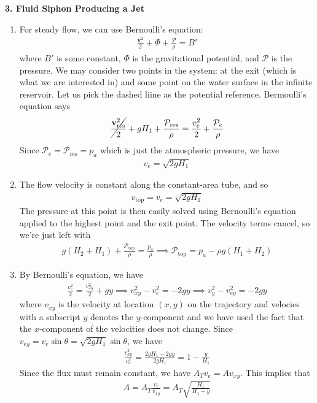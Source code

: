 \documentclass{article}
\theoremstyle{definition}
\newcommand{\f}[2]{\frac{#1}{#2}}
\begin{document}
\noindent \textbf{3. Fluid Siphon Producing a Jet} 

\begin{enumerate}[label=(\alph*)]
	\item For steady flow, we can use Bernoulli's equation:
	\begin{align*}
	\f{\mathbf{v}^2}{2} + \Phi + \f{\mathcal{P}}{\rho} = B' 
	\end{align*}
	where $B'$ is some constant, $\Phi$ is the gravitational potential, and $\mathcal{P}$ is the pressure. We may consider two points in the system: at the exit (which is what we are interested in) and some point on the water surface in the infinite reservoir. Let us pick the dashed liine as the potential reference. Bermoulli's equation says
	\begin{align*}
	\cancel{\f{\mathbf{v}_\text{res}^2}{2}} + gH_1 + \f{\mathcal{P}_\text{res}}{\rho}  = \f{v_e^2}{2} + \f{\mathcal{P}_e}{\rho}
	\end{align*}
	Since $\mathcal{P}_e = \mathcal{P}_\text{res} = p_a$ which is just the atmospheric pressure, we have
	\begin{align*}
	\boxed{v_e = \sqrt{2g H_1}}
	\end{align*}
	
	\item The flow velocity is constant along the constant-area tube, and so 
	\begin{align*}
	\boxed{v_\text{top} = v_e = \sqrt{2 g H_1}}
	\end{align*}
	The pressure at this point is then easily solved using Bernoulli's equation applied to the highest point and the exit point. The velocity terms cancel, so we're just left with
	\begin{align*}
	g(H_2+H_1) + \f{\mathcal{P}_\text{top}}{\rho} =  \f{p_a}{\rho} \implies \boxed{\mathcal{P}_\text{top} = p_a - \rho g (H_1 +  H_2) }
	\end{align*}
	
	
	
	
	\item By Bernoulli's equation, we have
	\begin{align*}
	\f{v_e^2}{2} = \f{v_{xy}^2}{2} + gy \implies v_{xy}^2 - v_e^2 = -2gy \implies v_y^2 - v_{ey}^2 = -2gy
	\end{align*}
	where $v_{xy}$ is the velocity at location $(x,y)$ on the trajectory and velocies with a subscript $y$ denotes the $y$-component and we have used the fact that the $x$-component of the velocities does not change. Since $v_{ey} =  v_e\sin\theta = \sqrt{2g H_1}\sin\theta$, we have
	\begin{align*}
	\f{v_{xy}^2}{v_e^2} = \f{2g H_1  -2gy}{2g H_1} = 1-\f{y}{H_1}
	\end{align*}
	Since the flux must remain constant, we have $A_T v_e = A v_{xy}$. This implies that
	\begin{align*}
	\boxed{A = A_T \f{v_e}{v_{xy}} = A_T \sqrt{\f{H_1}{H_1 - y}}}
	\end{align*}
	

\end{enumerate}
\end{document}
